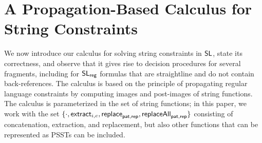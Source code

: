 
\section{A Propagation-Based Calculus for String Constraints}
\label{sect:calculus}


We now introduce our calculus for solving string constraints in
$\mathsf{SL}$, state its correctness, and observe that it gives rise to
decision procedures for several fragments, including for
$\mathsf{SL}_{\sf reg}$ formulas that are straightline and do not contain
back-references. The calculus is based on the principle of propagating
regular language constraints by computing images and post-images of
string functions. The calculus is parameterized in the set of string
functions; in this paper, we work with the set
$\{\cdot, \mathsf{extract}_{i, e}, \mathsf{replace}_{\mathsf{pat}, \mathsf{rep}}, \mathsf{replaceAll}_{\mathsf{pat},
  \mathsf{rep}}\}$ consisting of concatenation, extraction, and replacement,
but also other functions that can be represented as PSSTs can be
included.


